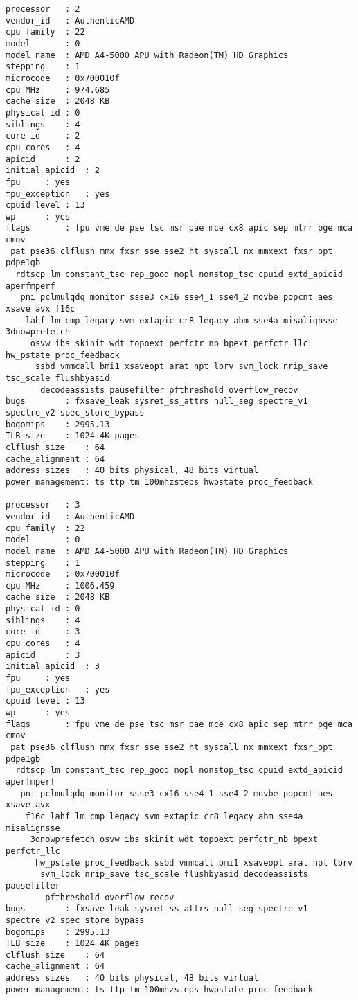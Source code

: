 \documentclass[11pt]{article}
\begin{document}
\begin{tiny}
\begin{verbatim}
processor	: 2
vendor_id	: AuthenticAMD
cpu family	: 22
model		: 0
model name	: AMD A4-5000 APU with Radeon(TM) HD Graphics
stepping	: 1
microcode	: 0x700010f
cpu MHz		: 974.685
cache size	: 2048 KB
physical id	: 0
siblings	: 4
core id		: 2
cpu cores	: 4
apicid		: 2
initial apicid	: 2
fpu		: yes
fpu_exception	: yes
cpuid level	: 13
wp		: yes
flags		: fpu vme de pse tsc msr pae mce cx8 apic sep mtrr pge mca cmov
 pat pse36 clflush mmx fxsr sse sse2 ht syscall nx mmxext fxsr_opt pdpe1gb
  rdtscp lm constant_tsc rep_good nopl nonstop_tsc cpuid extd_apicid aperfmperf
   pni pclmulqdq monitor ssse3 cx16 sse4_1 sse4_2 movbe popcnt aes xsave avx f16c
    lahf_lm cmp_legacy svm extapic cr8_legacy abm sse4a misalignsse 3dnowprefetch
     osvw ibs skinit wdt topoext perfctr_nb bpext perfctr_llc hw_pstate proc_feedback
      ssbd vmmcall bmi1 xsaveopt arat npt lbrv svm_lock nrip_save tsc_scale flushbyasid
       decodeassists pausefilter pfthreshold overflow_recov
bugs		: fxsave_leak sysret_ss_attrs null_seg spectre_v1 spectre_v2 spec_store_bypass
bogomips	: 2995.13
TLB size	: 1024 4K pages
clflush size	: 64
cache_alignment	: 64
address sizes	: 40 bits physical, 48 bits virtual
power management: ts ttp tm 100mhzsteps hwpstate proc_feedback

processor	: 3
vendor_id	: AuthenticAMD
cpu family	: 22
model		: 0
model name	: AMD A4-5000 APU with Radeon(TM) HD Graphics
stepping	: 1
microcode	: 0x700010f
cpu MHz		: 1006.459
cache size	: 2048 KB
physical id	: 0
siblings	: 4
core id		: 3
cpu cores	: 4
apicid		: 3
initial apicid	: 3
fpu		: yes
fpu_exception	: yes
cpuid level	: 13
wp		: yes
flags		: fpu vme de pse tsc msr pae mce cx8 apic sep mtrr pge mca cmov
 pat pse36 clflush mmx fxsr sse sse2 ht syscall nx mmxext fxsr_opt pdpe1gb
  rdtscp lm constant_tsc rep_good nopl nonstop_tsc cpuid extd_apicid aperfmperf
   pni pclmulqdq monitor ssse3 cx16 sse4_1 sse4_2 movbe popcnt aes xsave avx
    f16c lahf_lm cmp_legacy svm extapic cr8_legacy abm sse4a misalignsse
     3dnowprefetch osvw ibs skinit wdt topoext perfctr_nb bpext perfctr_llc
      hw_pstate proc_feedback ssbd vmmcall bmi1 xsaveopt arat npt lbrv
       svm_lock nrip_save tsc_scale flushbyasid decodeassists pausefilter
        pfthreshold overflow_recov
bugs		: fxsave_leak sysret_ss_attrs null_seg spectre_v1 spectre_v2 spec_store_bypass
bogomips	: 2995.13
TLB size	: 1024 4K pages
clflush size	: 64
cache_alignment	: 64
address sizes	: 40 bits physical, 48 bits virtual
power management: ts ttp tm 100mhzsteps hwpstate proc_feedback


        \end{verbatim}
      \end{tiny}
\end{document}
